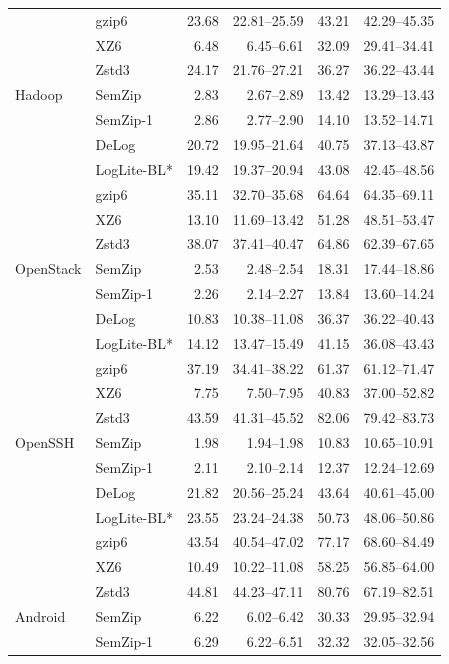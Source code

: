 \begin{longtable}{llrrrr}
 & gzip6 & 23.68 & 22.81--25.59 & 43.21 & 42.29--45.35 \\
 & XZ6 & 6.48 & 6.45--6.61 & 32.09 & 29.41--34.41 \\
 & Zstd3 & 24.17 & 21.76--27.21 & 36.27 & 36.22--43.44 \\
\midrule
Hadoop & SemZip & 2.83 & 2.67--2.89 & 13.42 & 13.29--13.43 \\
 & SemZip-1 & 2.86 & 2.77--2.90 & 14.10 & 13.52--14.71 \\
 & DeLog & 20.72 & 19.95--21.64 & 40.75 & 37.13--43.87 \\
 & LogLite-BL* & 19.42 & 19.37--20.94 & 43.08 & 42.45--48.56 \\
 & gzip6 & 35.11 & 32.70--35.68 & 64.64 & 64.35--69.11 \\
 & XZ6 & 13.10 & 11.69--13.42 & 51.28 & 48.51--53.47 \\
 & Zstd3 & 38.07 & 37.41--40.47 & 64.86 & 62.39--67.65 \\
\midrule
OpenStack & SemZip & 2.53 & 2.48--2.54 & 18.31 & 17.44--18.86 \\
 & SemZip-1 & 2.26 & 2.14--2.27 & 13.84 & 13.60--14.24 \\
 & DeLog & 10.83 & 10.38--11.08 & 36.37 & 36.22--40.43 \\
 & LogLite-BL* & 14.12 & 13.47--15.49 & 41.15 & 36.08--43.43 \\
 & gzip6 & 37.19 & 34.41--38.22 & 61.37 & 61.12--71.47 \\
 & XZ6 & 7.75 & 7.50--7.95 & 40.83 & 37.00--52.82 \\
 & Zstd3 & 43.59 & 41.31--45.52 & 82.06 & 79.42--83.73 \\
\midrule
OpenSSH & SemZip & 1.98 & 1.94--1.98 & 10.83 & 10.65--10.91 \\
 & SemZip-1 & 2.11 & 2.10--2.14 & 12.37 & 12.24--12.69 \\
 & DeLog & 21.82 & 20.56--25.24 & 43.64 & 40.61--45.00 \\
 & LogLite-BL* & 23.55 & 23.24--24.38 & 50.73 & 48.06--50.86 \\
 & gzip6 & 43.54 & 40.54--47.02 & 77.17 & 68.60--84.49 \\
 & XZ6 & 10.49 & 10.22--11.08 & 58.25 & 56.85--64.00 \\
 & Zstd3 & 44.81 & 44.23--47.11 & 80.76 & 67.19--82.51 \\
\midrule
Android & SemZip & 6.22 & 6.02--6.42 & 30.33 & 29.95--32.94 \\
 & SemZip-1 & 6.29 & 6.22--6.51 & 32.32 & 32.05--32.56 \\

\end{longtable}
